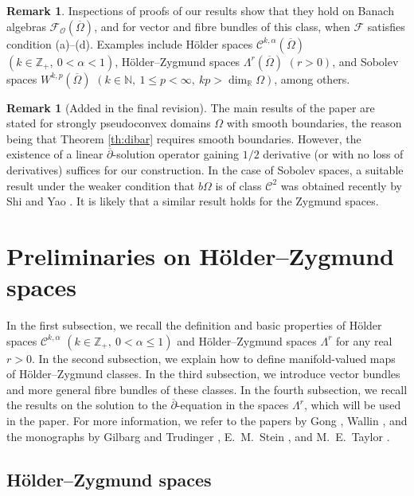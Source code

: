 \documentclass[11pt]{amsart}
\numberwithin{equation}{section}
\theoremstyle{definition}
\newtheorem{remark}[theorem]{Remark}
\newcommand\Fcal{\mathcal{F}}
\newcommand\Cscr{\mathscr{C}}
\newcommand\Oscr{\mathscr{O}}
\newcommand\N{\mathbb{N}}
\newcommand\R{\mathbb{R}}
\newcommand\Z{\mathbb{Z}}
\newcommand\dibar{\overline\partial}
\begin{document}
\begin{remark}
Inspections of proofs of our results show that 
they hold on Banach algebras $\Fcal_\Oscr(\overline\Omega)$,
and for vector and fibre bundles of this class, when
$\Fcal$ satisfies condition (a)--(d). 
Examples include H\"older spaces $\Cscr^{k,\alpha}(\overline\Omega)$ 
$(k\in\Z_+,\ 0<\alpha<1)$,
H\"older--Zygmund spaces $\Lambda^r(\overline\Omega)$ $(r>0)$, 
and Sobolev spaces $W^{k,p}(\overline \Omega)$
$(k\in \N,\ 1\le p<\infty,\ kp>\dim_\R \Omega)$, among others. 
\end{remark}


\begin{remark}[Added in the final revision]
The main results of the paper are stated for strongly pseudoconvex 
domains $\Omega$ with smooth boundaries, the reason being 
that Theorem \ref{th:dibar} requires smooth boundaries. 
However, the existence of a linear $\overline\partial$-solution operator 
gaining $1/2$ derivative (or with no loss of derivatives) suffices for our
construction. In the case of Sobolev spaces, a suitable result
under the weaker condition that $b\Omega$ is of class $\Cscr^2$ was 
obtained recently by Shi and Yao \cite{ShiYao2025}.
It is likely that a similar result holds for the Zygmund spaces.
\end{remark}

%
%
%
%
\section{Preliminaries on H\"older--Zygmund spaces}\label{sec:prelim}

In the first subsection, we recall the definition and basic properties of 
H\"older spaces $\Cscr^{k,\alpha}$ $(k\in\Z_+,\ 0<\alpha\le 1)$  
and H\"older--Zygmund spaces $\Lambda^r$ for any real $r>0$. 
In the second subsection, we explain how to define
manifold-valued maps of H\"older--Zygmund classes.
In the third subsection, we introduce vector bundles and more
general fibre bundles of these classes. In the fourth subsection,
we recall the results on the solution to the $\dibar$-equation in 
the spaces $\Lambda^r$, which will be used in the paper. 
For more information, we refer to the papers by 
Gong \cite[Sect.\ 5]{Gong2025TAMS}, Wallin \cite{Wallin1988}, 
and the monographs by 
Gilbarg and Trudinger \cite[Sect. 4.1]{GilbargTrudinger1983},
E.\ M.\ Stein \cite[Sect.\ V.4]{SteinEM1970}, 
and M.\ E.\ Taylor \cite{TaylorME2023}. 



%
%
\subsection{H\"older--Zygmund spaces} \label{ss:HZspaces}
\end{document}
